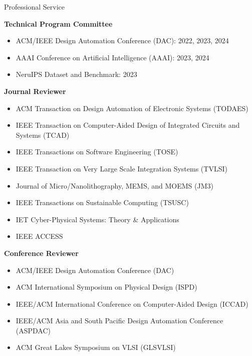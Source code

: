 \iftrue
\begin{rSection}{Professional Service}
	
\textbf{Technical Program Committee}
\begin{itemize}
	\item ACM/IEEE Design Automation Conference (DAC): 2022, 2023, 2024
	\item AAAI Conference on Artificial Intelligence (AAAI): 2023, 2024
	\item NeruIPS Dataset and Benchmark: 2023
\end{itemize}

\textbf{Journal Reviewer}
\begin{itemize}
    \item ACM Transaction on Design Automation of Electronic Systems (TODAES)
    \item IEEE Transaction on Computer-Aided Design of Integrated Circuits and Systems (TCAD)
    \item IEEE Transactions on Software Engineering (TOSE)
    \item IEEE Transaction on Very Large Scale Integration Systems (TVLSI)
    \item Journal of Micro/Nanolithography, MEMS, and MOEMS (JM3)
    \item IEEE Transactions on Sustainable Computing (TSUSC)
    \item IET Cyber-Physical Systems: Theory \& Applications
    \item IEEE ACCESS
\end{itemize}

\textbf{Conference Reviewer}
\begin{itemize}
    \item ACM/IEEE Design Automation Conference (DAC)
    \item ACM International Symposium on Physical Design (ISPD)
    \item IEEE/ACM International Conference on Computer-Aided Design (ICCAD)
    \item IEEE/ACM Asia and South Pacific Design Automation Conference (ASPDAC)
	\item ACM Great Lakes Symposium on VLSI (GLSVLSI)
\end{itemize}
\end{rSection}
\fi

